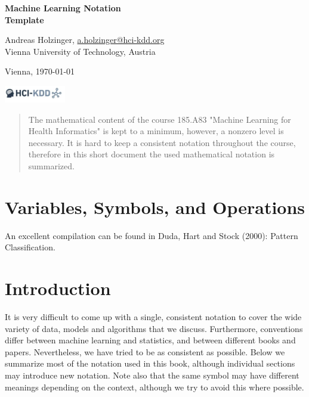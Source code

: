 \documentclass[a4paper,11pt]{article}
\begin{document}
	

\begin{titlepage}
\begin{center}
\bfseries\Large
Machine Learning Notation\\
Template

\vspace{\baselineskip}

\normalfont\normalsize

Andreas Holzinger, \href{mailto:a.holzinger@hci-kdd.org}{a.holzinger@hci-kdd.org} \\
Vienna University of Technology, Austria

\vspace{0.5\baselineskip}
Vienna, \today

\vspace{\baselineskip}
\includegraphics[width=0.2\textwidth]{images/hci-kdd-logo.jpg}


\end{center}
\vspace{\baselineskip}
\end{titlepage}


\begin{abstract}%
	The mathematical content of the course 185.A83 "Machine Learning for Health Informatics" is kept to a minimum, however, a nonzero level is necessary. It is hard to keep a consistent notation throughout the course, therefore in this short document the used mathematical notation is summarized.
\end{abstract}


\section{Variables, Symbols, and Operations}

An excellent compilation can be found in Duda, Hart and Stock (2000): Pattern Classification. 


\section*{Introduction}
It is very difficult to come up with a single, consistent notation to cover the wide variety of
data, models and algorithms that we discuss. Furthermore, conventions differ between machine
learning and statistics, and between different books and papers. Nevertheless, we have tried
to be as consistent as possible. Below we summarize most of the notation used in this book,
although individual sections may introduce new notation. Note also that the same symbol may
have different meanings depending on the context, although we try to avoid this where possible.
\end{document}
